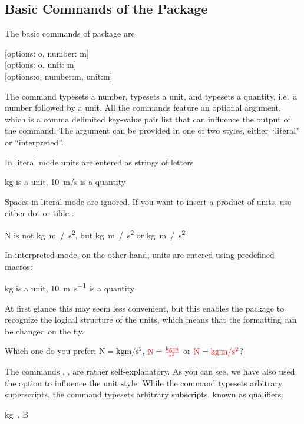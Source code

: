 \subsection{Basic Commands of the  Package}

The basic commands of  package are
\begin{lscommand}
  [options: o, number: m]\\
  [options: o, unit: m]\\
  [options:o, number:m, unit:m]
\end{lscommand}
The  command typesets a number,  typesets a unit, and
 typesets a quantity, i.e.\ a number followed by a unit. All the
commands feature an optional  argument, which is a comma delimited
key-value pair list that can influence the output of the command. The
 argument can be provided in one of two styles, either
\enquote{literal} or \enquote{interpreted}.

In literal mode units are entered as strings of letters
\begin{example}
\unit{kg} is a unit,
\qty{10}{m/s} is a quantity
\end{example}
Spaces in literal mode are ignored. If you want to insert a product of units,
use either dot  or tilde \ai{\~{}}.
\begin{example}
\unit{N} is
not \unit{kg m / s^2},
but \unit{kg.m / s^2}
or \unit{kg~m / s^2}
\end{example}

In interpreted mode, on the other hand, units are entered using predefined
macros:
\begin{example}
\unit{\kilo\gram} is a unit,
\qty{10}{\metre\per\second}
is a quantity
\end{example}
At first glance this may seem less convenient, but this enables the package to
recognize the logical structure of the units, which means that the formatting
can be changed on the fly.
\begin{example}[examplewidth=0.8\linewidth, vertical_mode]
Which one do you prefer:
\(\unit{\newton} = \unit{
  \kilo\gram\metre\per\square\second}\),
\(\unit{\newton} = \unit[per-mode = fraction]{
  \kilo\gram\metre\per\second\squared}\) or
\(\unit{\N} = \unit[per-mode = symbol]{
  \kg\m\per\s\tothe{2}}\)?
\end{example}
The commands , ,  are rather self-explanatory. As you
can see, we have also used the  option to influence the unit
style. While the command  typesets arbitrary superscripts, the
command  typesets arbitrary subscripts, known as qualifiers.
\begin{example}
\unit{\kg{}},
\unit{\bel{}}
\end{example}


